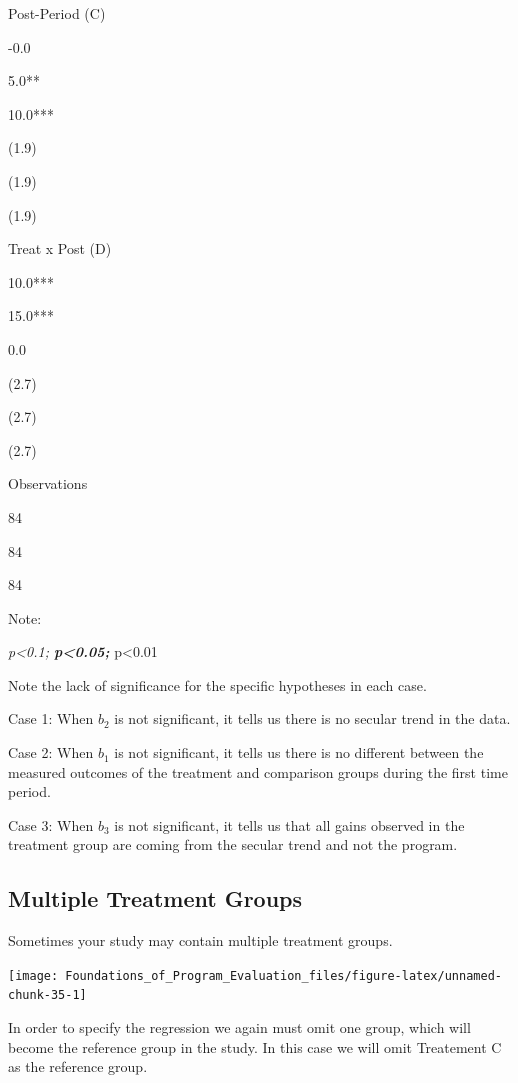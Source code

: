 \documentclass[]{book}
\theoremstyle{definition}
\theoremstyle{definition}
\theoremstyle{definition}
\theoremstyle{remark}
\begin{document}
Post-Period (C)

-0.0

5.0**

10.0***

(1.9)

(1.9)

(1.9)

Treat x Post (D)

10.0***

15.0***

0.0

(2.7)

(2.7)

(2.7)

Observations

84

84

84

Note:

\emph{p\textless{}0.1; \textbf{p\textless{}0.05; }}p\textless{}0.01

Note the lack of significance for the specific hypotheses in each case.

Case 1: When \(b_{2}\) is not significant, it tells us there is no
secular trend in the data.

Case 2: When \(b_{1}\) is not significant, it tells us there is no
different between the measured outcomes of the treatment and comparison
groups during the first time period.

Case 3: When \(b_{3}\) is not significant, it tells us that all gains
observed in the treatment group are coming from the secular trend and
not the program.

\hypertarget{multiple-treatment-groups}{%
\subsection{Multiple Treatment Groups}\label{multiple-treatment-groups}}

Sometimes your study may contain multiple treatment groups.

\begin{center}\texttt{[image: Foundations\_of\_Program\_Evaluation\_files/figure-latex/unnamed-chunk-35-1]} \end{center}

In order to specify the regression we again must omit one group, which
will become the reference group in the study. In this case we will omit
Treatement C as the reference group.
\end{document}
